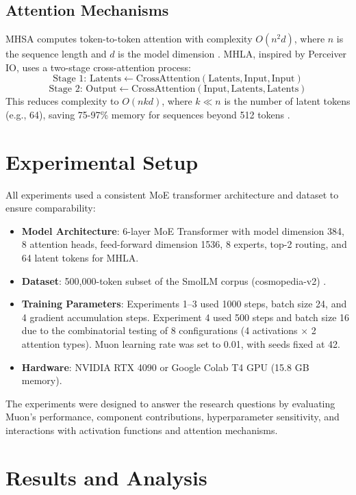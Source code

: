 \documentclass[11pt, a4paper]{article}
\begin{document}
\subsection{Attention Mechanisms}
MHSA computes token-to-token attention with complexity \(O(n^2d)\), where \(n\) is the sequence length and \(d\) is the model dimension \cite{vaswani2017attention}. MHLA, inspired by Perceiver IO, uses a two-stage cross-attention process:
\[
\text{Stage 1: } \text{Latents} \leftarrow \text{CrossAttention}(\text{Latents}, \text{Input}, \text{Input})
\]
\[
\text{Stage 2: } \text{Output} \leftarrow \text{CrossAttention}(\text{Input}, \text{Latents}, \text{Latents})
\]
This reduces complexity to \(O(nkd)\), where \(k \ll n\) is the number of latent tokens (e.g., 64), saving 75-97\% memory for sequences beyond 512 tokens \cite{jaegle2021perceiver, li2025transmla, deepseek2025v2}.

\section{Experimental Setup}
All experiments used a consistent MoE transformer architecture and dataset to ensure comparability:
\begin{itemize}
    \item \textbf{Model Architecture}: 6-layer MoE Transformer with model dimension 384, 8 attention heads, feed-forward dimension 1536, 8 experts, top-2 routing, and 64 latent tokens for MHLA.
    \item \textbf{Dataset}: 500,000-token subset of the SmolLM corpus (cosmopedia-v2) \cite{huggingface2024smollm}.
    \item \textbf{Training Parameters}: Experiments 1–3 used 1000 steps, batch size 24, and 4 gradient accumulation steps. Experiment 4 used 500 steps and batch size 16 due to the combinatorial testing of 8 configurations (4 activations × 2 attention types). Muon learning rate was set to 0.01, with seeds fixed at 42.
    \item \textbf{Hardware}: NVIDIA RTX 4090 or Google Colab T4 GPU (15.8 GB memory).
\end{itemize}
The experiments were designed to answer the research questions by evaluating Muon’s performance, component contributions, hyperparameter sensitivity, and interactions with activation functions and attention mechanisms.

\section{Results and Analysis}
\end{document}
